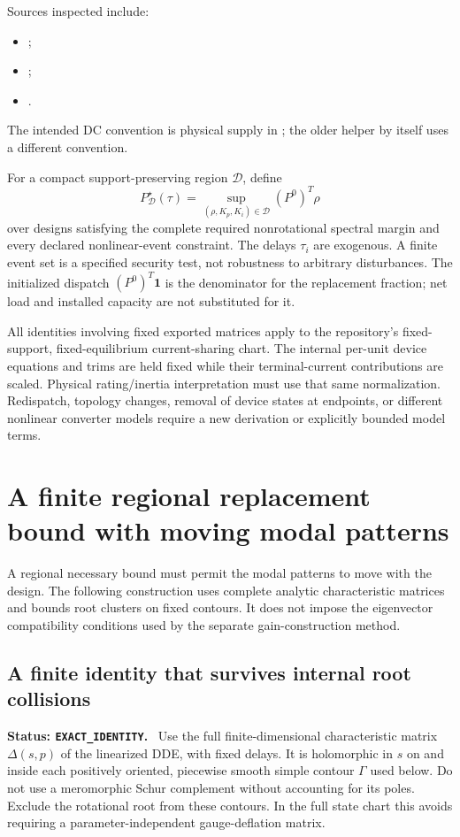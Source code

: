 \documentclass[11pt]{article}
\newcommand{\status}[1]{\par\smallskip\noindent\textbf{Status: \texttt{#1}.}\ }
\begin{document}
Sources inspected include:
\begin{itemize}
\item {};
\item {};
\item {}.
\end{itemize}
The intended DC convention is physical supply in ;
the older helper by itself uses a different convention.


For a compact support-preserving region $\mathcal D$, define
\[
 P^\star_{\mathcal D}(\tau)=
 \sup_{(\rho,K_p,K_i)\in\mathcal D}
 (P^0)^T\rho
\]
over designs satisfying the complete required nonrotational spectral
margin and every declared nonlinear-event constraint.
The delays $\tau_i$ are exogenous. A finite event set is a specified
security test, not robustness to arbitrary disturbances.
The initialized dispatch $(P^0)^T\mathbf1$ is the denominator for
the replacement fraction; net load and installed capacity are not
substituted for it.

All identities involving fixed exported matrices apply to the
repository's fixed-support, fixed-equilibrium current-sharing chart.
The internal per-unit device equations and trims are held fixed
while their terminal-current contributions are scaled. Physical
rating/inertia interpretation must use that same normalization.
Redispatch, topology changes, removal of device states at endpoints,
or different nonlinear converter models require a new derivation
or explicitly bounded model terms.
\section{A finite regional replacement bound with moving modal patterns}
\label{sec:regional}

A regional necessary bound must permit the modal patterns to move
with the design. The following construction uses complete analytic
characteristic matrices and bounds root clusters on fixed contours.
It does not impose the eigenvector compatibility conditions used
by the separate gain-construction method.

\subsection{A finite identity that survives internal root collisions}
\status{EXACT\_IDENTITY}
Use the full finite-dimensional characteristic matrix
$\Delta(s,p)$ of the linearized DDE, with fixed delays.
It is holomorphic in $s$ on and inside each positively oriented,
piecewise smooth simple contour $\Gamma$ used below.
Do not use a meromorphic Schur complement without accounting for its poles.
Exclude the rotational root from these contours. In the full state chart
this avoids requiring a parameter-independent gauge-deflation matrix.
\end{document}
